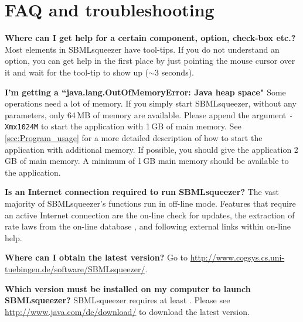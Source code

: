 \chapter{\acs{FAQ} and troubleshooting}
\label{ch:faq}


\noindent \textbf{Where can I get help for a certain component, option, check-box etc.?}\newline
Most elements in SBMLsqueezer have tool-tips. If you do not understand an option, you
can get help in the first place by just pointing the mouse cursor over it and
wait for the tool-tip to show up ($\sim$3 seconds).\newline

\noindent \textbf{I'm getting a ``java.lang.OutOfMemoryError: Java heap space"}\newline
Some operations need a lot of memory. If you simply start SBMLsqueezer, without any
\JVM parameters, only 64\,MB of memory are available. Please append the argument
\texttt{-Xmx1024M} to start the application with 1\,GB of main memory. See
\vref{sec:Program_usage} for a more detailed description of how to
start the application with additional memory. If possible, you should give the
application 2\,GB of main memory. A minimum of 1\,GB main memory should be
available to the application.\newline

\noindent \textbf{Is an Internet connection required to run SBMLsqueezer?}\newline
The vast majority of SBMLsqueezer's functions run in off-line mode.
Features that require an active Internet connection are the on-line check for updates, the extraction of rate laws from the on-line database \SABIO, and following external links within on-line help.
\newline

\noindent \textbf{Where can I obtain the latest version?}\newline
Go to \url{http://www.cogsys.cs.uni-tuebingen.de/software/SBMLsqueezer/}.\newline

\noindent \textbf{Which \Java version must be installed on my computer to launch SBMLsqueezer?}\newline
SBMLsqueezer requires at least . Please see \url{http://www.java.com/de/download/} to download the latest \Java version.\newline

